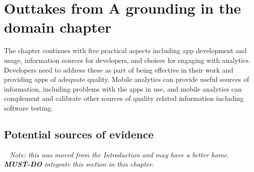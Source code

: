 \chapter{Outtakes from A grounding in the domain chapter}

The chapter continues with five practical aspects including app development and usage, information sources for developers, and choices for engaging with analytics. Developers need to address these as part of being effective in their work and providing apps of adequate quality. Mobile analytics can provide useful sources of information, including problems with the apps in use, and mobile analytics can complement and calibrate other sources of quality related information including software testing. 

\section{Potential sources of evidence}~\label{sec:potential-sources-of-evidence}
\emph{Note: this was moved from the Introduction and may have a better home. \textbf{MUST-DO} integrate this section in this chapter.}

